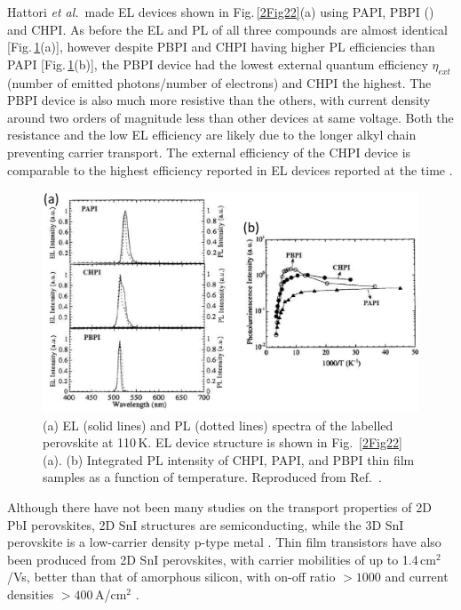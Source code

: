 Hattori \textit{et al.}\ made EL devices shown in Fig.\,\ref{2Fig22}(a) using PAPI, PBPI () and CHPI. As before the EL and PL of all three compounds are almost identical [Fig.\,\ref{2Fig23}(a)], however despite PBPI and CHPI having higher PL efficiencies than PAPI [Fig.\,\ref{2Fig23}(b)], the PBPI device had the lowest external quantum efficiency $\eta_{ext}$ (number of emitted photons/number of electrons) and CHPI the highest. The PBPI device is also much more resistive than the others, with current density around two orders of magnitude less than other devices at same voltage. Both the resistance and the low EL efficiency are likely due to the longer alkyl chain preventing carrier transport. The external efficiency of the CHPI device is comparable to the highest efficiency reported in EL devices reported at the time \cite{Hattori1996}.
\begin{figure}[h!]
\centering
\includegraphics[width=\textwidth]{Fig23}
\caption{(a) EL (solid lines) and PL (dotted lines) spectra of the labelled perovskite at 110\,K. EL device structure is shown in Fig.\ \ref{2Fig22}(a). (b) Integrated PL intensity of CHPI, PAPI, and PBPI thin film samples as a function of temperature. Reproduced from Ref.\ \cite{Hattori1996}.}
\label{2Fig23}
\end{figure}

Although there have not been many studies on the transport properties of 2D PbI perovskites, 2D SnI structures are semiconducting, while the 3D SnI perovskite is a low-carrier density p-type metal \cite{Mitzi1994}. Thin film transistors have also been produced from 2D SnI perovskites, with carrier mobilities of up to 1.4\,cm$^2$/Vs, better than that of amorphous silicon, with on-off ratio $>1000$ and current densities $>400$\,A/cm$^2$ \cite{Mitzi2002b, Mitzi2001d, Kagan1999a}.


